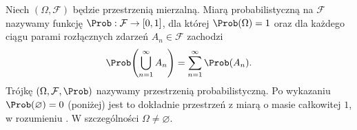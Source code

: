 \begin{definicja}
Niech $(\Omega,\mathcal F)$ będzie przestrzenią mierzalną.
Miarą probabilistyczną na $\mathcal F$ nazywamy funkcję
$\Prob:\mathcal F\to[0,1]$, dla której $\Prob(\Omega)=1$
oraz dla każdego ciągu parami rozłącznych zdarzeń $A_n\in\mathcal F$
zachodzi
\begin{equation}\label{eq:sigma_add}
\Prob\!\left(\bigcup_{n=1}^\infty A_n\right)
=\sum_{n=1}^\infty\Prob(A_n).
\end{equation}
Trójkę $(\Omega,\mathcal F,\Prob)$ nazywamy przestrzenią probabilistyczną.
Po wykazaniu $\Prob(\varnothing)=0$ (poniżej) jest to dokładnie
przestrzeń z miarą o masie całkowitej $1$, w rozumieniu
.
W szczególności $\Omega\ne\varnothing$.
\end{definicja}

